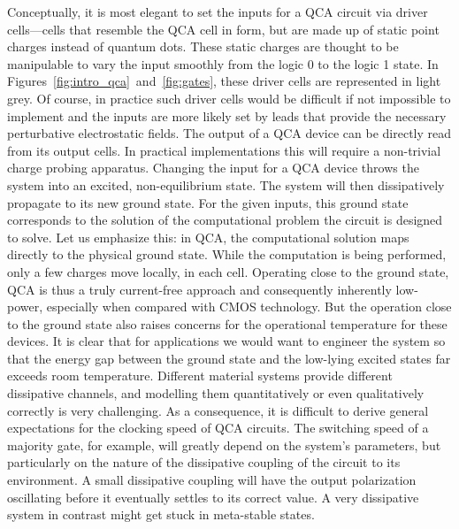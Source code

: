 Conceptually, it is most elegant to set the inputs for a QCA circuit via driver
cells---cells that resemble the QCA cell in form, but are made up of static
point charges instead of quantum dots. These static charges are thought to be
manipulable to vary the input smoothly from the logic 0 to the logic 1 state.
In Figures~\ref{fig:intro_qca}~and~\ref{fig:gates}, these driver cells are
represented in light grey. Of course, in practice such driver cells would be
difficult if not impossible to implement and the inputs are more likely set by
leads that provide the necessary perturbative electrostatic fields. The output
of a QCA device can be directly read from its output cells. In practical
implementations this will require a non-trivial charge probing apparatus.
Changing the input for a QCA device throws the system into an excited,
non-equilibrium state. The system will then dissipatively propagate to its new
ground state. For the given inputs, this ground state corresponds to the
solution of the computational problem the circuit is designed to solve. Let us
emphasize this: in QCA, the computational solution maps directly to the physical
ground state. While the computation is being performed, only a few charges move locally,
in each cell. Operating close to the ground state, QCA is thus a truly
current-free approach and consequently inherently low-power, especially when
compared with CMOS technology. But the operation close to the ground state also
raises concerns for the operational temperature for these devices. It is clear
that for applications we would want to engineer the system so that the energy
gap between the ground state and the low-lying excited states far exceeds room
temperature. Different material systems provide different dissipative channels,
and modelling them quantitatively or even qualitatively correctly is very
challenging. As a consequence, it is difficult to derive general expectations
for the clocking speed of QCA circuits. The switching speed of a majority gate,
for example, will greatly depend on the system's parameters, but particularly on
the nature of the dissipative coupling of the circuit to its environment. A
small dissipative coupling will have the output polarization oscillating before
it eventually settles to its correct value. A very dissipative system in
contrast might get stuck in meta-stable states. 

